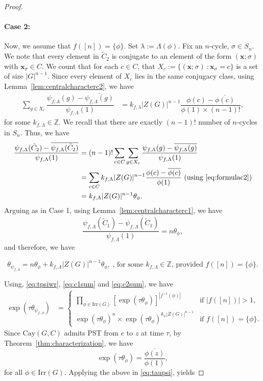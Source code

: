 \documentclass[10pt,a4paper]{amsart}
\newcommand{\bb}{\mathbb}
\newcommand{\irr}{\mathrm{Irr}}
\newcommand{\mbf}{\mathbf}
\newcommand{\mrm}{\mathrm}
\newcommand{\ov}{\overline}
\begin{document}
\begin{proof}
 \paragraph{Case 2:} Now, we assume that $f([n])=\{\phi\}$. Set $\lambda:=\Lambda(\phi)$. Fix an $n$-cycle, $\sigma \in S_{n}$. We note that every element in $\tilde{C}_{2}$ is conjugate to an element of the form $(\mbf{x}; \sigma)$ with $\mbf{x}_{\sigma} \in C$. We count that for each $c \in C$, that $X_{c}:=\{(\mbf{x}; \sigma) \ : \mbf{x}_{\sigma} = c \}$ is a set of size $|G|^{n-1}$.  Since every element of $X_{c}$ lies in the same conjugacy class, using Lemma~\ref{lem:centralcharacterc2}, we have
 \begin{align}\label{eq:formulac2}
     \sum\limits_{g \in X_{c}}\dfrac{\psi_{f,\Lambda}(g)-\ov{\psi_{f,\Lambda}(g)}}{\psi_{f, \Lambda}(1)} & =k_{f, \lambda} |Z(G)|^{n-1} \dfrac{\phi(c)-\ov{\phi(c)}}{\phi(1)\times (n-1)!},
 \end{align}
 for some $k_{f,\Lambda}\in \bb{Z}$.
 We recall that there are exactly $(n-1)!$ number of $n$-cycles in $S_{n}$. Thus, we have
\begin{align*}
\dfrac{\psi_{f, \Lambda}(\tilde{C}_{2})-\ov{\psi_{f, \Lambda}(\tilde{C}_{2})}}{\psi_{f, \Lambda}(1)} &= (n-1)!\sum\limits_{c \in C}\sum\limits_{g \in X_{c}}\dfrac{\psi_{f,\Lambda}(g)-\ov{\psi_{f,\Lambda}(g)}}{\psi_{f, \Lambda}(1)} \\
&= \sum\limits_{c \in C}k_{f,\Lambda}|Z(G)|^{n-1} \dfrac{\phi(c) - \ov{\phi(c)}}{\phi(1)} \ \text{(using \eqref{eq:formulac2})}\\
&=k_{f,\Lambda}|Z(G)|^{n-1}\theta_{\phi}.
\end{align*}
Arguing as in Case 1, using Lemma~\ref{lem:centralcharacterc1}, we have
\[\dfrac{\psi_{f, \Lambda}(\tilde{C}_{1})-\ov{\psi_{f, \Lambda}(\tilde{C}_{1})}}{\psi_{f, \Lambda}(1)}=n\theta_{\phi},\] and therefore, we have 

\begin{equation}\label{eq:c2sum}
\theta_{\psi_{f, \Lambda}} = n \theta_{\phi} + k_{f,\Lambda}|Z(G)|^{n-1}\theta_{\phi},\ \text{, for some $k_{f,\Lambda}\in \bb{Z}$, provided $f([n])=\{\phi\}$.}
\end{equation}

Using, \eqref{eq:tpsiwr}, \eqref{eq:c1sum} and \eqref{eq:c2sum}, we have 
\begin{align}\label{eq:taupsi}
\exp\left( \tau \theta_{\psi_{f,\Lambda}}\right) &= \begin{cases} \prod\limits_{\phi \in \irr(G)} \left[ \exp\left( \tau \theta_{\phi} \right) \right]^{|f^{-1}(\phi)|} & \text{if $|f([n])|>1$,}\\
\exp{(\tau\theta_{\phi})}^{n} \times \exp(\tau \theta_{\phi})^{k_{\psi} |Z(G)|^{n-1}} &\text{if $f([n])=\{\phi\}$.} 
\end{cases}
\end{align}
Since $\mrm{Cay}(G, C)$ admits PST from $e$ to $z$ at time $\tau$, by Theorem~\ref{thm:characterization}, we have \[\exp\left( \tau \theta_{\phi} \right) = \frac{\ov{\phi(z)}}{\phi(1)},\] for all $\phi \in \irr(G)$. Applying the above in \eqref{eq:taupsi}, yields


\end{proof}
\end{document}
